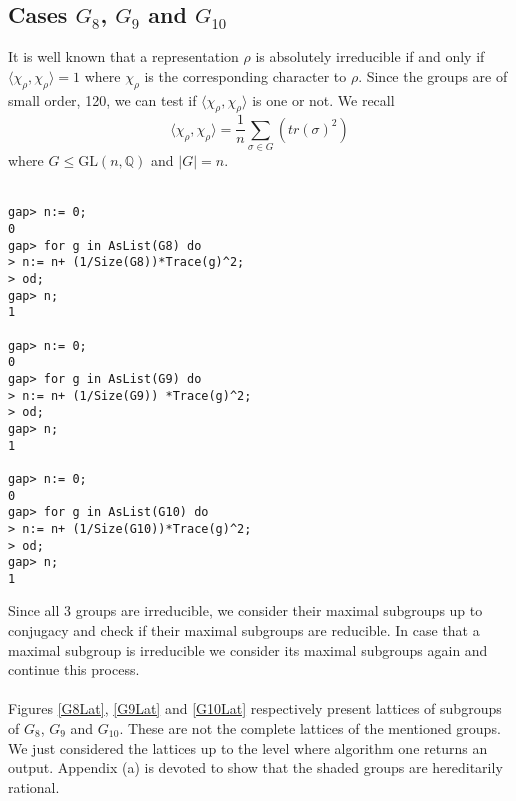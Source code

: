 \documentclass{article}
\theoremstyle{plain}
\theoremstyle{definition}
\newcommand{\Q}{\ensuremath{\mathbb{Q}}}
\begin{document}
\subsection{Cases $G_8$, $G_9$ and $G_{10}$}
It is well known that a representation $\rho$ is absolutely irreducible if and only if $\langle \chi_{\rho},\chi_{\rho} \rangle =1 $ where $\chi_{\rho}$ is the corresponding character to $\rho$. Since the groups are of small order, 120, we can test if $\langle \chi_{\rho},\chi_{\rho} \rangle $ is one or not. We recall $$\langle \chi_{\rho},\chi_{\rho} \rangle = \frac{1}{n} \sum_{\sigma \in G} (tr(\sigma)^2)$$ where $G\leq \mathrm{GL}(n,\Q)$ and $|G| = n$.\\
\\
\begin{verbatim}
gap> n:= 0;
0
gap> for g in AsList(G8) do
> n:= n+ (1/Size(G8))*Trace(g)^2;
> od;
gap> n;
1

gap> n:= 0;
0
gap> for g in AsList(G9) do
> n:= n+ (1/Size(G9)) *Trace(g)^2;
> od;
gap> n;
1

gap> n:= 0;
0
gap> for g in AsList(G10) do
> n:= n+ (1/Size(G10))*Trace(g)^2;
> od;
gap> n;
1
\end{verbatim}
\noindent
Since all 3 groups are irreducible, we consider their maximal subgroups up to conjugacy and check if their maximal subgroups are reducible. In case that a maximal subgroup is irreducible we consider its maximal subgroups again and continue this process. \\
\\
Figures \ref{G8Lat}, \ref{G9Lat} and \ref{G10Lat} respectively present lattices of subgroups of $G_8$, $G_9$ and $G_{10}$. These are not the complete lattices of the mentioned groups. We just considered the lattices up to the level where algorithm one returns an output. Appendix (a) is devoted to show that the shaded groups are hereditarily rational.
\end{document}
